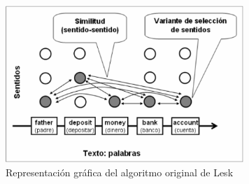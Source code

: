   \begin{figure}[h!]
    \begin{center}
    \includegraphics[angle=0, width=9cm]{Graficos/algoritmo_lesk}
    \caption{Representación gráfica del algoritmo original de Lesk \cite{001}}
    \label{fig:algoritmo_lesk}
    \end{center}
  \end{figure}

